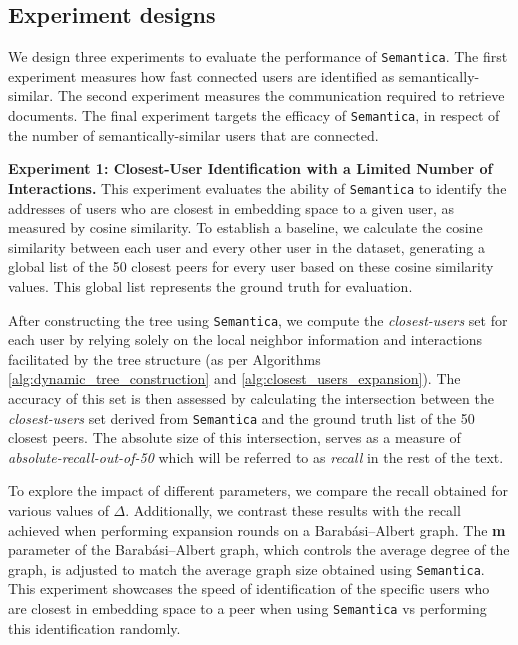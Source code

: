 \documentclass[10pt,journal]{IEEEtran}
\newcommand{\algorithmname}{\texttt{Semantica}}
\begin{document}
\subsection{Experiment designs}
\label{sec:experiments}

We design three experiments to evaluate the performance of \algorithmname{}.
The first experiment measures how fast connected users are identified as semantically-similar.
The second experiment measures the communication required to retrieve documents.
The final experiment targets the efficacy of \algorithmname{}, in respect of the number of semantically-similar users that are connected.

\textbf{Experiment 1: Closest-User Identification with a Limited Number of Interactions.}
This experiment evaluates the ability of \algorithmname{} to identify the addresses of users who are closest in embedding space to a given user, as measured by cosine similarity. To establish a baseline, we calculate the cosine similarity between each user and every other user in the dataset, generating a global list of the 50 closest peers for every user based on these cosine similarity values. This global list represents the ground truth for evaluation.

After constructing the tree using \algorithmname{}, we compute the \textit{closest-users} set for each user by relying solely on the local neighbor information and interactions facilitated by the tree structure (as per Algorithms \ref{alg:dynamic_tree_construction} and \ref{alg:closest_users_expansion}). The accuracy of this set is then assessed by calculating the intersection between the \textit{closest-users} set derived from \algorithmname{} and the ground truth list of the 50 closest peers. The absolute size of this intersection, serves as a measure of \textit{absolute-recall-out-of-50} which will be referred to as \textit{recall} in the rest of the text.

To explore the impact of different parameters, we compare the recall obtained for various values of $\Delta$. Additionally, we contrast these results with the recall achieved when performing expansion rounds on a Barabási–Albert graph. The \textbf{m} parameter of the Barabási–Albert graph, which controls the average degree of the graph, is adjusted to match the average graph size obtained using \algorithmname{}. This experiment showcases the speed of identification of the specific users who are closest in embedding space to a peer when using \algorithmname{} vs performing this identification randomly. 
\end{document}
